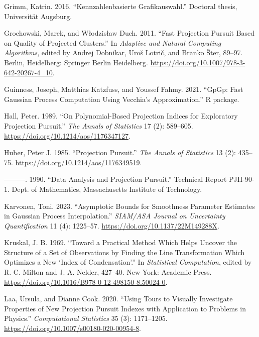 \documentclass[
  12pt,
]{interact}
\newlength{\cslhangindent}
\newlength{\cslentryspacingunit} %
\newenvironment{CSLReferences}[2] %
 {%
  \setlength{\parindent}{0pt}
  \ifodd #1
  \let\oldpar\par
  \def\par{\hangindent=\cslhangindent\oldpar}
  \fi
  \setlength{\parskip}{#2\cslentryspacingunit}
 }%
 {}
\theoremstyle{plain}
\begin{document}
\begin{CSLReferences}{1}{0}
\leavevmode{}%
Grimm, Katrin. 2016. {``Kennzahlenbasierte Grafikauswahl.''} Doctoral
thesis, Universit{ä}t Augsburg.

\leavevmode{}%
Grochowski, Marek, and Włodzisław Duch. 2011. {``Fast Projection Pursuit
Based on Quality of Projected Clusters.''} In \emph{Adaptive and Natural
Computing Algorithms}, edited by Andrej Dobnikar, Uroš Lotrič, and
Branko Šter, 89--97. Berlin, Heidelberg: Springer Berlin Heidelberg.
\url{https://doi.org/10.1007/978-3-642-20267-4_10}.

\leavevmode{}%
Guinness, Joseph, Matthias Katzfuss, and Youssef Fahmy. 2021. {``{GpGp}:
Fast {G}aussian Process Computation Using {V}ecchia's Approximation.''}
R package.

\leavevmode{}%
Hall, Peter. 1989. {``On Polynomial-Based Projection Indices for
Exploratory Projection Pursuit.''} \emph{The Annals of Statistics} 17
(2): 589--605. \url{https://doi.org/10.1214/aos/1176347127}.

\leavevmode{}%
Huber, Peter J. 1985. {``Projection Pursuit.''} \emph{The Annals of
Statistics} 13 (2): 435--75.
\url{https://doi.org/10.1214/aos/1176349519}.

\leavevmode{}%
---------. 1990. {``Data Analysis and Projection Pursuit.''} Technical
Report PJH-90-1. Dept. of Mathematics, Massachusetts Institute of
Technology.

\leavevmode{}%
Karvonen, Toni. 2023. {``Asymptotic Bounds for Smoothness Parameter
Estimates in {G}aussian Process Interpolation.''} \emph{SIAM/ASA Journal
on Uncertainty Quantification} 11 (4): 1225--57.
\url{https://doi.org/10.1137/22M149288X}.

\leavevmode{}%
Kruskal, J. B. 1969. {``Toward a Practical Method Which Helps Uncover
the Structure of a Set of Observations by Finding the Line
Transformation Which Optimizes a New {`Index of Condensation'}.''} In
\emph{Statistical Computation}, edited by R. C. Milton and J. A. Nelder,
427--40. New York: Academic Press.
\url{https://doi.org/10.1016/B978-0-12-498150-8.50024-0}.

\leavevmode{}%
Laa, Ursula, and Dianne Cook. 2020. {``Using Tours to Visually
Investigate Properties of New Projection Pursuit Indexes with
Application to Problems in Physics.''} \emph{Computational Statistics}
35 (3): 1171--1205. \url{https://doi.org/10.1007/s00180-020-00954-8}.


\end{CSLReferences}
\end{document}

